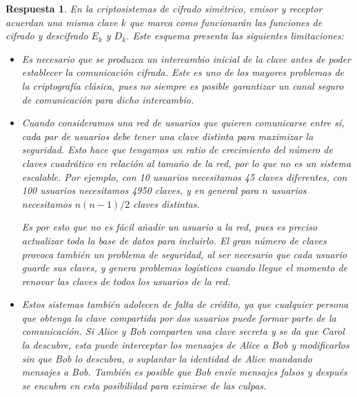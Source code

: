 \documentclass[
  a4paper,
  spanish,
  12pt,
]{scrartcl}
\theoremstyle{ejercicio-style}
\theoremstyle{remark-style}
\newtheorem*{sol}{Respuesta}
\theoremstyle{teorema-style}
\begin{document}
\begin{sol}
  En la criptosistemas de cifrado simétrico, emisor y receptor acuerdan una misma clave $k$ que marca como funcionarán las funciones de cifrado y descifrado $E_k$ y $D_k$. Este esquema presenta las siguientes limitaciones:

\begin{itemize}
\item Es necesario que se produzca un intercambio inicial de la clave antes de poder establecer la comunicación cifrada. Este es uno de los mayores problemas de la criptografía clásica, pues no siempre es posible garantizar un canal seguro de comunicación para dicho intercambio.


\item Cuando consideramos una red de usuarios que quieren comunicarse entre sí, cada par de usuarios debe tener una clave distinta para maximizar la seguridad. Esto hace que tengamos un ratio de crecimiento del número de claves cuadrático en relación al tamaño de la red, por lo que no es un sistema escalable. Por ejemplo, con 10 usuarios necesitamos 45 claves diferentes, con 100 usuarios necesitamos 4950 claves, y en general para $n$ usuarios necesitamos $n(n-1)/2$ claves distintas.

Es por esto que no es fácil añadir un usuario a la red, pues es preciso actualizar toda la base de datos para incluirlo. El gran número de claves provoca también un problema de seguridad, al ser necesario que cada usuario guarde sus claves, y genera problemas logísticos cuando llegue el momento de renovar las claves de todos los usuarios de la red.

\item Estos sistemas también adolecen de falta de crédito, ya que cualquier persona que obtenga la clave compartida por dos usuarios puede formar parte de la comunicación. Si Alice y Bob comparten una clave secreta y se da que Carol la descubre, esta puede interceptar los mensajes de Alice a Bob y modificarlos sin que Bob lo descubra, o suplantar la identidad de Alice mandando mensajes a Bob. También es posible que Bob envíe mensajes falsos y después se encubra en esta posibilidad para eximirse de las culpas.
\end{itemize}


\end{sol}
\end{document}
